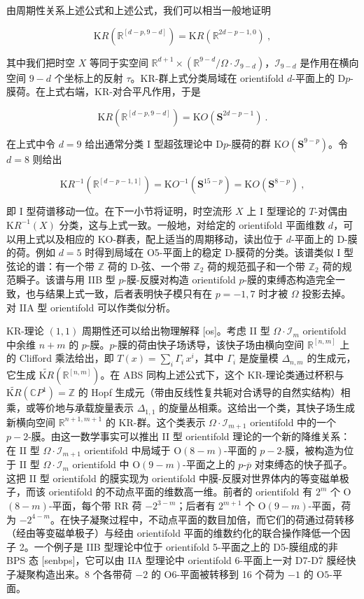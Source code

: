 \documentclass[11pt,a4paper]{ctexart}
\begin{document}
由周期性关系上述公式和上述公式，我们可以相当一般地证明

\[{\mathrm KR}({\mathbb{R}}^[d-p,9-d])={\mathrm KR}({\mathbb{R}}^{2d-p-1,0})\ ,\]

其中我们把时空 \(X\) 等同于实空间 \({\mathbb{R}}^{d+1}\times({\mathbb{R}}^{9-d}/\Omega\cdot{\mathcal I}_{9-d})\)，\({\mathcal I}_{9-d}\) 是作用在横向空间 \(9-d\) 个坐标上的反射 \(\tau\)。KR-群上式分类局域在 orientifold \(d\)-平面上的 D\(p\)-膜荷。在上式右端，KR-对合平凡作用，于是

\[{\mathrm KR}({\mathbb{R}}^[d-p,9-d])={\mathrm KO}({\mathbf S}^{2d-p-1})\ .\]

在上式中令 \(d=9\) 给出通常分类 I 型超弦理论中 D\(p\)-膜荷的群 \({\mathrm KO}({\mathbf S}^{9-p})\)。令 \(d=8\) 则给出

\[{\mathrm KR}^{-1}({\mathbb{R}}^[d-p-1,1])={\mathrm KO}^{-1}({\mathbf S}^{15-p})
={\mathrm KO}({\mathbf S}^{8-p})\ ,\]

即 I 型荷谱移动一位。在下一小节将证明，时空流形 \(X\) 上 I 型理论的 \(T\)-对偶由 \({\mathrm KR}^{-1}(X)\) 分类，这与上式一致。一般地，对给定的 orientifold 平面维数 \(d\)，可以用上式以及相应的 KO-群表，配上适当的周期移动，读出位于 \(d\)-平面上的 D-膜的荷。例如 \(d=5\) 时得到局域在 O5-平面上的稳定 D-膜荷的分类。该谱类似 I 型弦论的谱：有一个带 \({\mathbb{Z}}\) 荷的 D-弦、一个带 \({\mathbb{Z}}_2\) 荷的规范孤子和一个带 \({\mathbb{Z}}_2\) 荷的规范瞬子。该谱与用 IIB 型 \(p\)-膜-反膜对构造 orientifold \(p\)-膜的束缚态构造完全一致，也与结果上式一致，后者表明快子模只有在 \(p=-1,7\) 时才被 \(\Omega\) 投影去掉。对 IIA 型 orientifold 可以作类似分析。

KR-理论 \((1,1)\) 周期性还可以给出物理解释 [os]。考虑 II 型 \(\Omega\cdot{\mathcal I}_m\) orientifold 中余维 \(n+m\) 的 \(p\)-膜。\(p\)-膜的荷由快子场诱导，该快子场由横向空间 \({\mathbb{R}}^[n,m]\) 上的 Clifford 乘法给出，即 \(T(x)=\sum_i\Gamma_i\,x^i\)，其中 \(\Gamma_i\) 是旋量模 \(\Delta_{n,m}\) 的生成元，它生成 \(\widetilde{{\mathrm KR}}({\mathbb{R}}^[n,m])\)。在 ABS 同构上述公式下，这个 KR-理论类通过杯积与 \(\widetilde{{\mathrm KR}}({\mathbb{C}} P^1)={\mathbb{Z}}\) 的 Hopf 生成元（带由反线性复共轭对合诱导的自然实结构）相乘，或等价地与承载旋量表示 \(\Delta_{1,1}\) 的旋量丛相乘。这给出一个类，其快子场生成新横向空间 \({\mathbb{R}}^{n+1,m+1}\) 的 KR-群。这个类表示 \(\Omega\cdot{\mathcal I}_{m+1}\) orientifold 中的一个 \(p-2\)-膜。由这一数学事实可以推出 II 型 orientifold 理论的一个新的降维关系：在 II 型 \(\Omega\cdot{\mathcal I}_{m+1}\) orientifold 中局域于 O\((8-m)\)-平面的 \(p-2\)-膜，被构造为位于 II 型 \(\Omega\cdot{\mathcal I}_m\) orientifold 中 O\((9-m)\)-平面之上的 \(p\)-\(\overline{p}\) 对束缚态的快子孤子。这把 II 型 orientifold 的膜实现为 orientifold 中膜-反膜对世界体内的等变磁单极子，而该 orientifold 的不动点平面的维数高一维。前者的 orientifold 有 \(2^m\) 个 O\((8-m)\)-平面，每个带 RR 荷 \(-2^{3-m}\)；后者有 \(2^{m+1}\) 个 O\((9-m)\)-平面，荷为 \(-2^{4-m}\)。在快子凝聚过程中，不动点平面的数目加倍，而它们的荷通过荷转移（经由等变磁单极子）与经由 orientifold 平面的维数约化的联合操作降低一个因子 2。一个例子是 IIB 型理论中位于 orientifold 5-平面之上的 D5-膜组成的非 BPS 态 [senbps]，它可以由 IIA 型理论中 orientifold 6-平面上一对 D7-D\(\overline{7}\) 膜经快子凝聚构造出来。8 个各带荷 \(-2\) 的 O\(6\)-平面被转移到 16 个荷为 \(-1\) 的 O\(5\)-平面。
\end{document}
